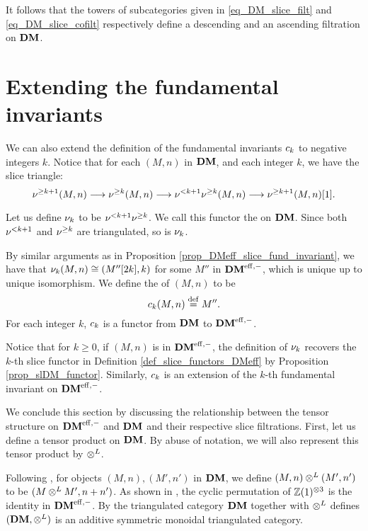 It follows that the towers of subcategories given in 
\eqref{eq_DM_slice_filt} and \eqref{eq_DM_slice_cofilt} 
respectively define a descending and an ascending filtration on 
$\mathbf{DM}$.

\section{Extending the fundamental invariants}

We can also extend the definition of the fundamental invariants
$c_{k}$ to negative integers $k$. Notice that for each $(M, n)$
in $\mathbf{DM}$, and each integer $k$, we have the slice triangle:
\[
\nu^{\geq k + 1}(M, n) \longrightarrow \nu^{\geq k}(M, n) \longrightarrow \nu^{< k + 1}\nu^{\geq k}(M, n)
\longrightarrow \nu^{\geq k + 1}(M, n)[1].
\]

\begin{defn}
Let us define $\nu_{k}$ to be $\nu^{< k + 1}\nu^{\geq k}$. We call
this functor the  on $\mathbf{DM}$. Since both 
$\nu^{< k + 1}$ and $\nu^{\geq k}$ are triangulated, so is 
$\nu_{k}$.

By similar arguments as in Proposition 
\ref{prop_DMeff_slice_fund_invariant}, we have that 
$\nu_{k}(M, n) \cong (M''[2k], k)$ for some $M''$ in $\mathbf{DM}^{\mathrm{eff},-}$,
which is unique up to unique isomorphism. We 
define the  of $(M, n)$ to be
\[
c_{k}(M, n) \stackrel{\mathrm{def}}{=} M''.
\]
For each integer $k$, $c_{k}$ is a functor from $\mathbf{DM}$ to
$\mathbf{DM}^{\mathrm{eff},-}$.

Notice that for $k \geq 0$, if $(M, n)$ is in $\mathbf{DM}^{\mathrm{eff},-}$, the definition
of $\nu_{k}$ recovers the $k$-th slice functor in Definition
\ref{def_slice_functors_DMeff} by Proposition
\ref{prop_slDM_functor}. Similarly, $c_{k}$ is an extension of the
$k$-th fundamental invariant on $\mathbf{DM}^{\mathrm{eff},-}$.
\end{defn}

We conclude this section by discussing the relationship between the
tensor structure on $\mathbf{DM}^{\mathrm{eff},-}$ and $\mathbf{DM}$ and their respective slice
filtrations. First, let us define a tensor product on $\mathbf{DM}$. By 
abuse of notation, we will also represent this tensor product by 
$\otimes^L$.

\begin{defn}\label{def_tensor_DM}
Following \cite[8A]{MVW}, for objects $(M, n), (M', n')$ in $\mathbf{DM}$, we 
define $(M, n) \otimes^L (M', n')$ to be $(M \otimes^L M', n + n')$. As 
shown in \cite[15.8]{MVW}, the cyclic permutation of 
$\mathbb{Z}(1)^{\otimes 3}$ is the identity in $\mathbf{DM}^{\mathrm{eff},-}$. By 
\cite[8A.12]{MVW} the triangulated category $\mathbf{DM}$ together with 
$\otimes^L$ defines $(\mathbf{DM}, \otimes^L)$ is an additive symmetric monoidal 
triangulated category. 
\end{defn}

